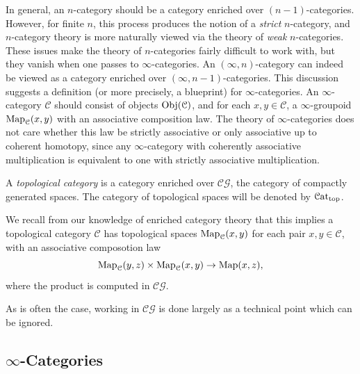 In general, an $n$-category should be a category enriched over $(n-1)$-categories. However, for finite $n$, this process produces the notion of a \emph{strict} $n$-category, and $n$-category theory is more naturally viewed via the theory of \emph{weak} $n$-categories. These issues make the theory of $n$-categories fairly difficult to work with, but they vanish when one passes to $\infty $-categories. An $(\infty ,n)$-category can indeed be viewed as a category enriched over $(\infty ,n-1)$-categories. This discussion suggests a definition (or more precisely, a blueprint) for $\infty $-categories. An $\infty $-category $\mathcal{C} $ should consist of objects $\operatorname{Obj}(\mathcal{C} ) $, and for each $x,y\in\mathcal{C} $, a $\infty $-groupoid $\operatorname{Map} _\mathcal{C} (x,y)$ with an associative composition law. The theory of $\infty $-categories does not care whether this law be strictly associative or only associative up to coherent homotopy, since any $\infty $-category with coherently associative multiplication is equivalent to one with strictly associative multiplication.

\begin{definition}\label{1.1.1.1}
	A \emph{topological category} is a category enriched over $\mathcal{C} \mathcal{G} $, the category of compactly generated spaces. The category of topological spaces will be denoted by $\mathcal{C}\mathrm{at} _{\text{top} } $.
\end{definition}

We recall from our knowledge of enriched category theory that this implies a topological category $\mathcal{C} $ has topological spaces $\operatorname{Map} _\mathcal{C} (x,y)$ for each pair $x,y\in\mathcal{C} $, with an associative composotion law
\[
	\operatorname{Map}_\mathcal{C} (y,z)\times \operatorname{Map}_\mathcal{C} (x,y)\to \operatorname{Map} (x,z),
\]
where the product is computed in $\mathcal{C} \mathcal{G} $.

\begin{remark}\label{1.1.1.2}
	As is often the case, working in $\mathcal{C} \mathcal{G} $ is done largely as a technical point which can be ignored.
\end{remark}

\subsection{$\infty $-Categories}\label{sec1.1.2}

